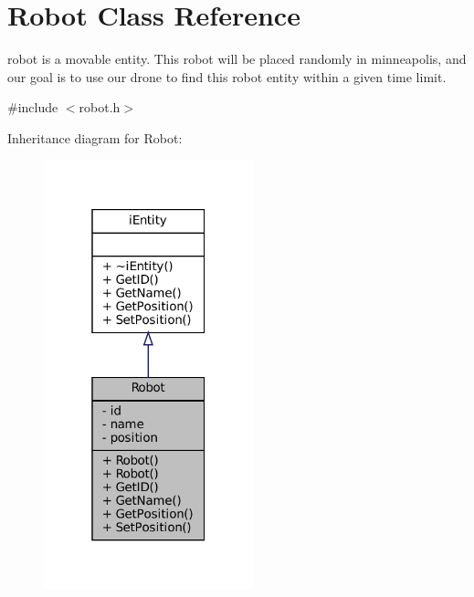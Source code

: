 \hypertarget{classRobot}{}\section{Robot Class Reference}
\label{classRobot}


robot is a movable entity. This robot will be placed randomly in minneapolis, and our goal is to use our drone to find this robot entity within a given time limit.  




{\ttfamily \#include $<$robot.\+h$>$}



Inheritance diagram for Robot\+:\nopagebreak
\begin{figure}[H]
\begin{center}
\leavevmode
\includegraphics[width=172pt]{classRobot__inherit__graph}
\end{center}
\end{figure}


